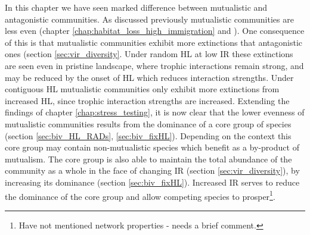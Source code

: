 In this chapter we have seen marked difference between mutualistic and antagonistic communities. As discussed previously mutualistic communities are less even (chapter \ref{chap:habitat_loss_high_immigration} and \cite{lurgi2015effects}). One consequence of this is that mutualistic communities exhibit more extinctions that antagonistic ones (section \ref{sec:vir_diversity}. Under random HL at low IR these extinctions are seen even in pristine landscape, where trophic interactions remain strong, and may be reduced by the onset of HL which reduces interaction strengths. Under contiguous HL mutualistic communities only exhibit more extinctions from increased HL, since trophic interaction strengths are increased. Extending the findings of chapter \ref{chap:stress_testing}, it is now clear that the lower evenness of mutualistic communities results from the dominance of a core group of species (section \ref{sec:biv_HL_RADs}, \ref{sec:biv_fixHL}). Depending on the context this core group may contain non-mutualistic species which benefit as a by-product of mutualism. The core group is also able to maintain the total abundance of the community as a whole in the face of changing IR (section \ref{sec:vir_diversity}), by increasing its dominance (section \ref{sec:biv_fixHL}). Increased IR serves to reduce the dominance of the core group and allow competing species to prosper\footnote{Have not mentioned network properties - needs a brief comment.}.

%
%
%
%
%
%

